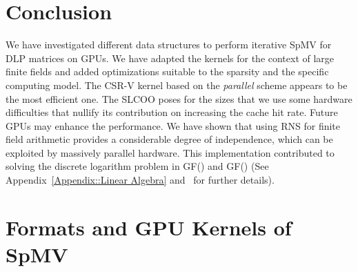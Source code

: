 \documentclass[runningheads,orivec]{llncs}
\begin{document}
\section{Conclusion}
\label{conclusion}
We have investigated different data structures to perform iterative SpMV for DLP matrices on GPUs. We have adapted the kernels for the context of large finite fields and added optimizations suitable to the sparsity and the specific computing model. The CSR-V kernel based on the \textit{parallel} scheme appears to be the most efficient one. The SLCOO poses for the sizes that we use some hardware difficulties that nullify its contribution on increasing the cache hit rate. Future GPUs may enhance the performance. We have shown that using RNS for finite field arithmetic provides a considerable degree of independence, which can be exploited by massively parallel hardware. This implementation contributed to solving the discrete logarithm problem in GF() and GF() (See Appendix~\ref{Appendix::Linear Algebra} and~\cite{FFS809,JEL14} for further details). 


\vspace*{-0.25cm}






\vspace*{-0.75cm}

\appendix
\section{Formats and GPU Kernels of SpMV}
\label{Appendix:: kernels}
\end{document}
